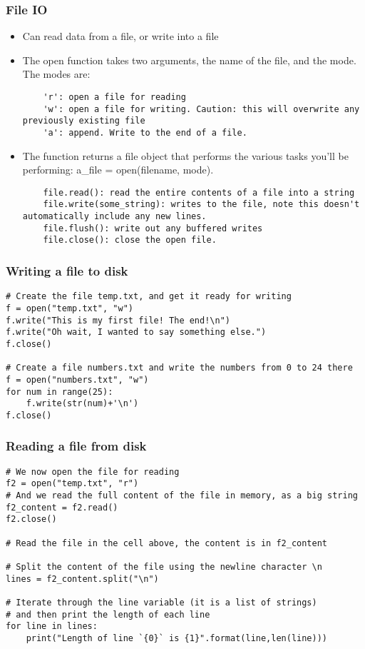 \begin{frame}[fragile]\frametitle{File IO}
\begin{itemize}
\item Can read data from a file, or write into a file
\item The open function takes two arguments, the name of the file, and the mode. The modes are:
\begin{lstlisting}
    'r': open a file for reading
    'w': open a file for writing. Caution: this will overwrite any previously existing file
    'a': append. Write to the end of a file.
\end{lstlisting}
\item The function returns a file object that performs the various tasks you'll be performing: a\_file = open(filename, mode). 
\begin{lstlisting}
    file.read(): read the entire contents of a file into a string
    file.write(some_string): writes to the file, note this doesn't automatically include any new lines.
    file.flush(): write out any buffered writes
    file.close(): close the open file. 
\end{lstlisting}
\end{itemize}
\end{frame}

\begin{frame}[fragile]\frametitle{Writing a file to disk}
\begin{lstlisting}
# Create the file temp.txt, and get it ready for writing
f = open("temp.txt", "w")
f.write("This is my first file! The end!\n")
f.write("Oh wait, I wanted to say something else.")
f.close()

# Create a file numbers.txt and write the numbers from 0 to 24 there
f = open("numbers.txt", "w")
for num in range(25):
    f.write(str(num)+'\n')
f.close()
\end{lstlisting}
\end{frame}


\begin{frame}[fragile]\frametitle{Reading a file from disk}
\begin{lstlisting}
# We now open the file for reading
f2 = open("temp.txt", "r")
# And we read the full content of the file in memory, as a big string
f2_content = f2.read()
f2.close()

# Read the file in the cell above, the content is in f2_content

# Split the content of the file using the newline character \n
lines = f2_content.split("\n")

# Iterate through the line variable (it is a list of strings)
# and then print the length of each line
for line in lines:
    print("Length of line `{0}` is {1}".format(line,len(line)))
\end{lstlisting}
\end{frame}

